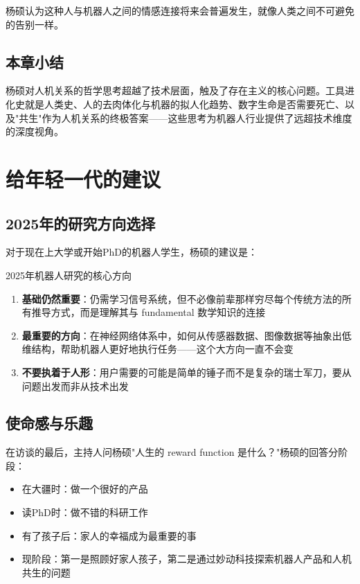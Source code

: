\documentclass[a4paper]{article}
\begin{document}
杨硕认为这种人与机器人之间的情感连接将来会普遍发生，就像人类之间不可避免的告别一样。

\subsection{本章小结}

杨硕对人机关系的哲学思考超越了技术层面，触及了存在主义的核心问题。工具进化史就是人类史、人的去肉体化与机器的拟人化趋势、数字生命是否需要死亡、以及"共生"作为人机关系的终极答案——这些思考为机器人行业提供了远超技术维度的深度视角。


\section{给年轻一代的建议}

\subsection{2025年的研究方向选择}

对于现在上大学或开始PhD的机器人学生，杨硕的建议是：

\begin{knowledgebox}{2025年机器人研究的核心方向}
\begin{enumerate}
    \item \textbf{基础仍然重要}：仍需学习信号系统，但不必像前辈那样穷尽每个传统方法的所有推导方式，而是理解其与 fundamental 数学知识的连接
    \item \textbf{最重要的方向}：在神经网络体系中，如何从传感器数据、图像数据等抽象出低维结构，帮助机器人更好地执行任务——这个大方向一直不会变
    \item \textbf{不要执着于人形}：用户需要的可能是简单的锤子而不是复杂的瑞士军刀，要从问题出发而非从技术出发
\end{enumerate}
\end{knowledgebox}

\subsection{使命感与乐趣}

在访谈的最后，主持人问杨硕"人生的 reward function 是什么？"杨硕的回答分阶段：
\begin{itemize}
    \item 在大疆时：做一个很好的产品
    \item 读PhD时：做不错的科研工作
    \item 有了孩子后：家人的幸福成为最重要的事
    \item 现阶段：第一是照顾好家人孩子，第二是通过妙动科技探索机器人产品和人机共生的问题
\end{itemize}
\end{document}
